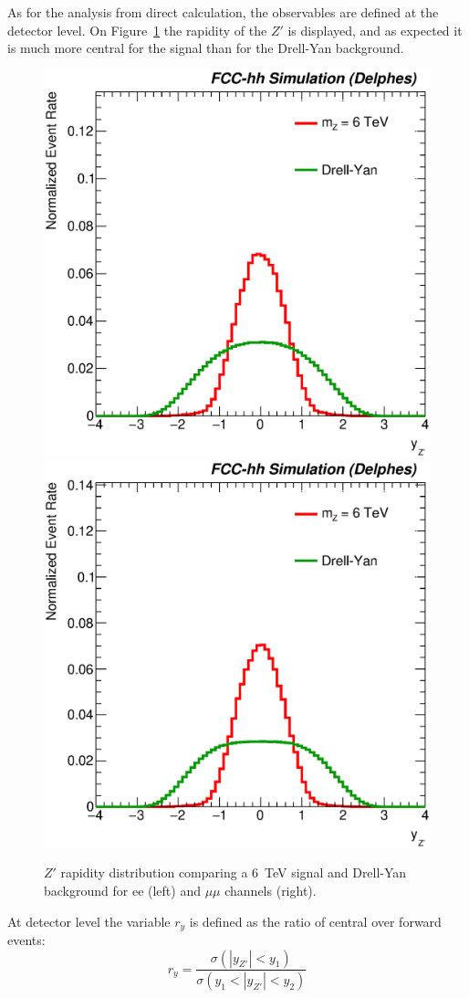 %

\label{subsubsection:vardef}

As for the analysis from direct calculation, the observables are defined at the detector level. On Figure~\ref{figure:lepana:yzp} the 
rapidity of the $Z'$ is displayed, and as expected it is much more central for the signal than for the Drell-Yan background.
\begin{figure}[!htb]
  \centering
  \includegraphics[width=0.45\columnwidth]{Fig/27tev/yzp_sel0_lin_norm_ee.eps}
  \includegraphics[width=0.45\columnwidth]{Fig/27tev/yzp_sel0_lin_norm_mumu.eps}
  \caption{$Z'$ rapidity distribution comparing a 6~TeV signal and Drell-Yan background for ee (left) and $\mu\mu$ channels (right).}
  \label{figure:lepana:yzp}
\end{figure}
At detector level the variable $r_y$ is defined as the ratio of central over forward events:
\begin{equation}
r_y = \frac{\sigma(|y_{Z'}| < y_1)}{\sigma(y_1 < |y_{Z'}| <y_2)}
\end{equation}
